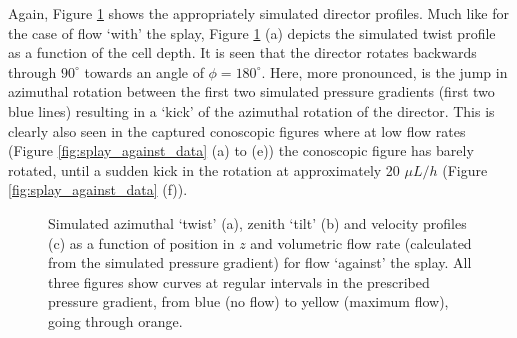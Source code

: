 Again, Figure \ref{fig:splayed_against_twist_tilt_profile} shows the appropriately simulated director profiles. Much like for the case of flow `with' the splay, Figure \ref{fig:splayed_against_twist_tilt_profile} (a) depicts the simulated twist profile as a function of the cell depth. It is seen that the director rotates backwards through $90^{\circ}$ towards an angle of $\phi=180^{\circ}$. Here, more pronounced, is the jump in azimuthal rotation between the first two simulated pressure gradients (first two blue lines) resulting in a `kick' of the azimuthal rotation of the director. This is clearly also seen in the captured conoscopic figures where at low flow rates (Figure \ref{fig:splay_against_data} (a) to (e)) the conoscopic figure has barely rotated, until a sudden kick in the rotation at approximately 20 $\mu L/h$ (Figure \ref{fig:splay_against_data} (f)).

\begin{figure}
\begin{center}
\end{center}
\caption[Simulated twist, tilt and velocity profiles for flow `against' the splay]{\label{fig:splayed_against_twist_tilt_profile}Simulated azimuthal `twist' (a), zenith `tilt' (b) and velocity profiles (c) as a function of position in $z$ and volumetric flow rate (calculated from the simulated pressure gradient) for flow `against' the splay. All three figures show curves at regular intervals in the prescribed pressure gradient, from blue (no flow) to yellow (maximum flow), going through orange.}
\end{figure}

